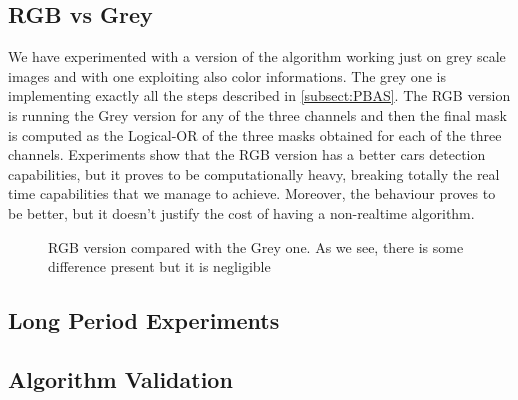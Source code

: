 \subsection{RGB vs Grey}
We have experimented with a version of the algorithm working just on grey scale images and with one exploiting also color informations. The grey one is implementing exactly all the steps described in \ref{subsect:PBAS}. The RGB version is running the Grey version for any of the three channels and then the final mask is computed as the Logical-OR of the three masks obtained for each of the three channels.
Experiments show that the RGB version has a better cars detection capabilities, but it proves to be computationally heavy, breaking totally the real time capabilities that we manage to achieve. Moreover, the behaviour proves to be better, but it doesn't justify the cost of having a non-realtime algorithm. 

\begin{figure}[!t]
    \centering
    \newline
	\caption{RGB version compared with the Grey one. As we see, there is some difference present but it is negligible}
\end{figure}

\subsection{Long Period Experiments}

\subsection{Algorithm Validation}

